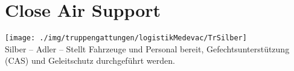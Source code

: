 \section{Close Air Support}
\texttt{[image: ./img/truppengattungen/logistikMedevac/TrSilber]}\\
Silber -- Adler -- Stellt Fahrzeuge und Personal bereit,  Gefechtsunterstützung (\ac{CAS}) und Geleitschutz durchgeführt werden.